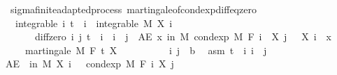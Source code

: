 \begin{isabellebody}
\begin{isamarkuptext}
\end{isamarkuptext}\isamarkuptrue%
\isamarkupfalse%
\ {\isacharparenleft}{\kern0pt}\ sigma{\isacharunderscore}{\kern0pt}finite{\isacharunderscore}{\kern0pt}adapted{\isacharunderscore}{\kern0pt}process{\isacharparenright}{\kern0pt}\ martingale{\isacharunderscore}{\kern0pt}of{\isacharunderscore}{\kern0pt}cond{\isacharunderscore}{\kern0pt}exp{\isacharunderscore}{\kern0pt}diff{\isacharunderscore}{\kern0pt}eq{\isacharunderscore}{\kern0pt}zero{\isacharcolon}{\kern0pt}\ \isanewline
\ \ \ integrable{\isacharcolon}{\kern0pt}\ {\isachardoublequoteopen}{\isasymAnd}i{\isachardot}{\kern0pt}\ t\ {\isasymle}\ i\ {\isasymLongrightarrow}\ integrable\ M\ {\isacharparenleft}{\kern0pt}X\ i{\isacharparenright}{\kern0pt}{\isachardoublequoteclose}\ \isanewline
\ \ \ \ \ \ \ diff{\isacharunderscore}{\kern0pt}zero{\isacharcolon}{\kern0pt}\ {\isachardoublequoteopen}{\isasymAnd}i\ j{\isachardot}{\kern0pt}\ t\ {\isasymle}\ i\ {\isasymLongrightarrow}\ i\ {\isasymle}\ j\ {\isasymLongrightarrow}\ AE\ x\ in\ M{\isachardot}{\kern0pt}\ cond{\isacharunderscore}{\kern0pt}exp\ M\ {\isacharparenleft}{\kern0pt}F\ i{\isacharparenright}{\kern0pt}\ {\isacharparenleft}{\kern0pt}{\isasymlambda}{\isasymxi}{\isachardot}{\kern0pt}\ X\ j\ {\isasymxi}\ {\isacharminus}{\kern0pt}\ X\ i\ {\isasymxi}{\isacharparenright}{\kern0pt}\ x\ {\isacharequal}{\kern0pt}\ {}{\isachardoublequoteclose}\isanewline
\ \ \ \ \ {\isachardoublequoteopen}martingale\ M\ F\ t\ X{\isachardoublequoteclose}\isanewline
%
\isadelimproof
%
\endisadelimproof
%
\isatagproof
{}\isamarkupfalse%
\ \isanewline
\ \ \isacommand{{\isacharbraceleft}{\kern0pt}}\isamarkupfalse%
\isanewline
\ \ \ \ \isamarkupfalse%
\ i\ j\ {\isacharcolon}{\kern0pt}{\isacharcolon}{\kern0pt}\ {\isacharprime}{\kern0pt}b\ \isamarkupfalse%
\ asm{\isacharcolon}{\kern0pt}\ {\isachardoublequoteopen}t\ {\isasymle}\ i{\isachardoublequoteclose}\ {\isachardoublequoteopen}i\ {\isasymle}\ j{\isachardoublequoteclose}\isanewline
\ \ \ \ \isamarkupfalse%
\ {\isachardoublequoteopen}AE\ {\isasymxi}\ in\ M{\isachardot}{\kern0pt}\ X\ i\ {\isasymxi}\ {\isacharequal}{\kern0pt}\ cond{\isacharunderscore}{\kern0pt}exp\ M\ {\isacharparenleft}{\kern0pt}F\ i{\isacharparenright}{\kern0pt}\ {\isacharparenleft}{\kern0pt}X\ j{\isacharparenright}{\kern0pt}\ {\isasymxi}{\isachardoublequoteclose}\ \isanewline

\end{isabellebody}
